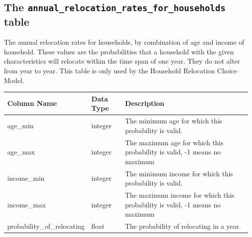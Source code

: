 \subsection{The {\tt annual_relocation_rates_for_households} table}


The annual relocation rates for households, by combination of age and income of
household. These values are the probabilities that a household with the given
characteristics will relocate within the time span of one year. They do not
alter from year to year. This table is only used by the Household Relocation
Choice Model. 


\begin{tabular}{|l|l|p{4in}|}
\hline
\textbf{Column Name} & \textbf{Data Type} & \textbf{Description} \\
\hline
age_min & integer & The minimum age for which this probability is valid.  \\
\hline
age_max & integer & The maximum age for which this probability is valid, -1 means no maximum  \\
\hline
income_min & integer & The minimum income for which this probability is valid.  \\
\hline
income_max & integer & The maximum income for which this probability is valid, -1 means no maximum  \\
\hline
probability_of_relocating & float & The probability of relocating in a year.  \\
\hline

\end{tabular}


